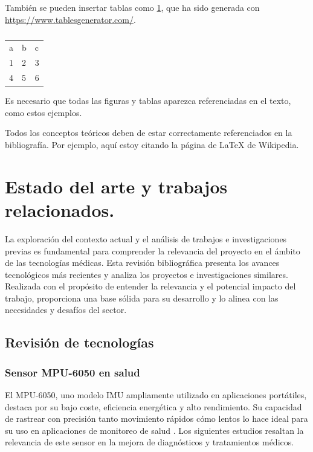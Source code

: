 También se pueden insertar tablas como \ref{tab:my-table}, que ha sido generada con \url{https://www.tablesgenerator.com/}.

\begin{table}[]
\begin{tabular}{lll}
a & b & c \\
1 & 2 & 3 \\
4 & 5 & 6
\end{tabular}
\caption{}
\label{tab:my-table}
\end{table}

Es necesario que todas las figuras y tablas aparezca referenciadas en el texto, como estos ejemplos.

Todos los conceptos teóricos deben de estar correctamente referenciados en la bibliografía. Por ejemplo, aquí estoy citando la página de \LaTeX{} de Wikipedia.




\section{Estado del arte y trabajos relacionados.}
La exploración del contexto actual y el análisis de trabajos e investigaciones previas es fundamental para comprender la relevancia del proyecto en el ámbito de las tecnologías médicas. Esta revisión bibliográfica presenta los avances tecnológicos más recientes y analiza los proyectos e investigaciones similares. Realizada con el propósito de entender la relevancia y el potencial impacto del trabajo, proporciona una base sólida para su desarrollo y lo alinea con las necesidades y desafíos del sector.

\subsection{Revisión de tecnologías}

\subsubsection{Sensor MPU-6050 en salud}
El MPU-6050, uno modelo IMU ampliamente utilizado en aplicaciones portátiles, destaca por su bajo coste, eficiencia energética y alto rendimiento. Su capacidad de rastrear con precisión tanto movimiento rápidos cómo lentos lo hace ideal para su uso en aplicaciones de monitoreo de salud \cite{Jian2016/06}. Los siguientes estudios resaltan la relevancia de este sensor en la mejora de diagnósticos y tratamientos médicos.

